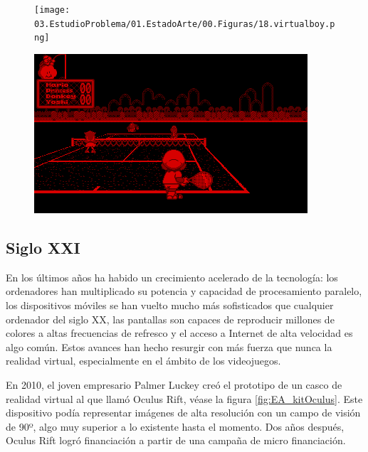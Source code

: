 \begin{figure}
\centering
\begin{minipage}{.5\textwidth}
  \centering
  \texttt{[image: 03.EstudioProblema/01.EstadoArte/00.Figuras/18.virtualboy.png]}
  \label{fig:EA_virtualBoy}
\end{minipage}%
\begin{minipage}{.5\textwidth}
  \centering
  \includegraphics[width=.9\linewidth]{03.EstudioProblema/01.EstadoArte/00.Figuras/19.marios_tennis.png}
  \label{fig:EA_virtualBoyJuego}
\end{minipage}
\end{figure}



\subsection{Siglo XXI}

En los últimos años ha habido un crecimiento acelerado de la tecnología: los ordenadores han multiplicado su potencia y capacidad de procesamiento paralelo, los dispositivos móviles se han vuelto mucho más sofisticados que cualquier ordenador del siglo XX, las pantallas son capaces de reproducir millones de colores a altas frecuencias de refresco y el acceso a Internet de alta velocidad es algo común. Estos avances han hecho resurgir con más fuerza que nunca la realidad virtual, especialmente en el ámbito de los videojuegos.

En 2010, el joven empresario Palmer Luckey creó el prototipo de un casco de realidad virtual al que llamó Oculus Rift, véase la figura \ref{fig:EA_kitOculus}. Este dispositivo podía representar imágenes de alta resolución con un campo de visión de 90º, algo muy superior a lo existente hasta el momento. Dos años después, Oculus Rift logró financiación a partir de una campaña de micro financiación.


